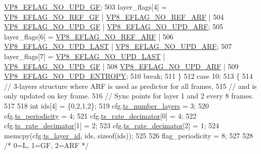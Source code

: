 \begin{DoxyCodeInclude}
{{{{{{{{{{{{{{{      \hyperlink{group__vp8__encoder_gab01d066c5236457d345ce1cab4c41d6b}{VP8\_EFLAG\_NO\_UPD\_GF};
503         layer\_flags[4] = \hyperlink{group__vp8__encoder_gabb5e95343a2738abef44eca13059da33}{VP8\_EFLAG\_NO\_REF\_GF} | 
      \hyperlink{group__vp8__encoder_ga650ab0baea12be91082226a5cc18776a}{VP8\_EFLAG\_NO\_REF\_ARF} |
504                          \hyperlink{group__vp8__encoder_gab01d066c5236457d345ce1cab4c41d6b}{VP8\_EFLAG\_NO\_UPD\_GF} | 
      \hyperlink{group__vp8__encoder_ga1cff46a5287e73a620660030d40b9e6c}{VP8\_EFLAG\_NO\_UPD\_ARF};
505         layer\_flags[6] = \hyperlink{group__vp8__encoder_ga650ab0baea12be91082226a5cc18776a}{VP8\_EFLAG\_NO\_REF\_ARF} |
506                          \hyperlink{group__vp8__encoder_ga602edb6b02a89cb2db7a16d6dffba583}{VP8\_EFLAG\_NO\_UPD\_LAST} | 
      \hyperlink{group__vp8__encoder_ga1cff46a5287e73a620660030d40b9e6c}{VP8\_EFLAG\_NO\_UPD\_ARF};
507         layer\_flags[7] = \hyperlink{group__vp8__encoder_ga602edb6b02a89cb2db7a16d6dffba583}{VP8\_EFLAG\_NO\_UPD\_LAST} | 
      \hyperlink{group__vp8__encoder_gab01d066c5236457d345ce1cab4c41d6b}{VP8\_EFLAG\_NO\_UPD\_GF} |
508                          \hyperlink{group__vp8__encoder_ga1cff46a5287e73a620660030d40b9e6c}{VP8\_EFLAG\_NO\_UPD\_ARF} |
509                          \hyperlink{group__vp8__encoder_ga5b91ad179910d4efc23aef66c7b2148b}{VP8\_EFLAG\_NO\_UPD\_ENTROPY};
510         \textcolor{keywordflow}{break};
511     \}
512     \textcolor{keywordflow}{case} 10:
513     \{
514         \textcolor{comment}{// 3-layers structure where ARF is used as predictor for all frames,}
515         \textcolor{comment}{// and is only updated on key frame.}
516         \textcolor{comment}{// Sync points for layer 1 and 2 every 8 frames.}
517 
518         \textcolor{keywordtype}{int} ids[4] = \{0,2,1,2\};
519         cfg.\hyperlink{structvpx__codec__enc__cfg_a16d4549a30cbd585e3c3056ef873d8c7}{ts\_number\_layers}     = 3;
520         cfg.\hyperlink{structvpx__codec__enc__cfg_a4ec338780115dd270acf0dac24193474}{ts\_periodicity}       = 4;
521         cfg.\hyperlink{structvpx__codec__enc__cfg_ad40c30846ef8ef1d8684f10a491ec535}{ts\_rate\_decimator}[0] = 4;
522         cfg.\hyperlink{structvpx__codec__enc__cfg_ad40c30846ef8ef1d8684f10a491ec535}{ts\_rate\_decimator}[1] = 2;
523         cfg.\hyperlink{structvpx__codec__enc__cfg_ad40c30846ef8ef1d8684f10a491ec535}{ts\_rate\_decimator}[2] = 1;
524         memcpy(cfg.\hyperlink{structvpx__codec__enc__cfg_a4d105d2470dbfb7210b33d298f1cf1f6}{ts\_layer\_id}, ids, \textcolor{keyword}{sizeof}(ids));
525 
526         flag\_periodicity = 8;
527 
528         \textcolor{comment}{/* 0=L, 1=GF, 2=ARF */}
}}}}}}}}}}}}}}}
\end{DoxyCodeInclude}
